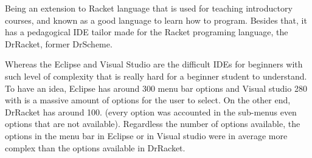 Being an extension to Racket language that is used for teaching introductory courses,
and known as a good language to learn how to program.
Besides that, it has a pedagogical IDE tailor made for the Racket programing language,
the DrRacket, former DrScheme. %



Whereas the Eclipse and Visual Studio are the difficult IDEs for beginners with such level of
complexity that is really hard for a beginner student to understand.
To have an idea, Eclipse has around 300 menu bar options and Visual studio 280 with is a massive amount
of options for the user to select. On the other end, DrRacket has around 100. (every option was accounted in the sub-menus
even options that are not available). Regardless the number of options available,
the options in the menu bar in Eclipse or in Visual studio were in average more complex than the
options available in DrRacket.



